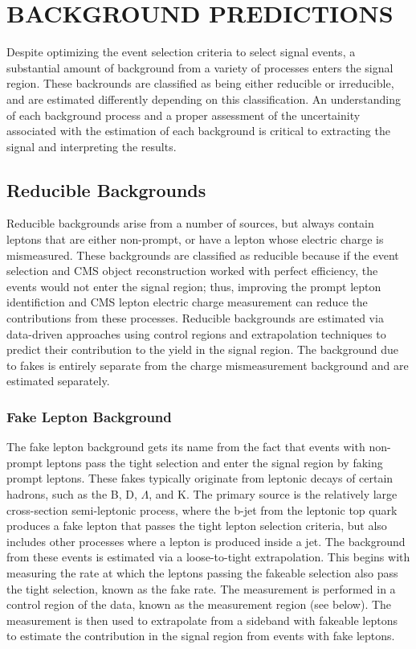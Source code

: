 %
%

\chapter{BACKGROUND PREDICTIONS}
\label{chap:background}
Despite optimizing the event selection criteria to select signal events, a substantial amount of background from a variety of processes enters the signal region.
These backrounds are classified as being either reducible or irreducible, and are estimated differently depending on this classification. An understanding
of each background process and a proper assessment of the uncertainity associated with the estimation of each background is critical to extracting the signal and interpreting
the results. 

\section{Reducible Backgrounds}
Reducible backgrounds arise from a number of sources, but always contain leptons that are either non-prompt, or have a lepton whose electric charge is mismeasured.
These backgrounds are classified as reducible because if the event selection and CMS object reconstruction worked with perfect efficiency, the events would not
enter the signal region; thus, improving the prompt lepton identifiction and CMS lepton electric charge measurement can reduce the contributions from these processes.
Reducible backgrounds are estimated via data-driven approaches using control regions and extrapolation techniques to predict their contribution to the yield in the
signal region. The background due to fakes is entirely separate from the charge mismeasurement background and are estimated separately. 

\subsection{Fake Lepton Background} 
The fake lepton background gets its name from the fact that events with non-prompt leptons pass the tight selection and enter the signal region by faking prompt leptons. These
fakes typically originate from leptonic decays of certain hadrons, such as the B, D, $\Lambda$, and K. The primary source is the relatively large cross-section semi-leptonic \ttbar
process, where the b-jet from the leptonic top quark produces a fake lepton that passes the tight lepton selection criteria, but also includes other processes where a lepton
is produced inside a jet. The background from these events is estimated via a loose-to-tight extrapolation. This begins with measuring the rate at which the leptons passing
the fakeable selection also pass the tight selection, known as the fake rate. The measurement is performed in a control region of the data, known as the measurement region (see below).
The measurement is then used to extrapolate from a sideband with fakeable leptons to estimate the contribution in the signal region 
from events with fake leptons. 

